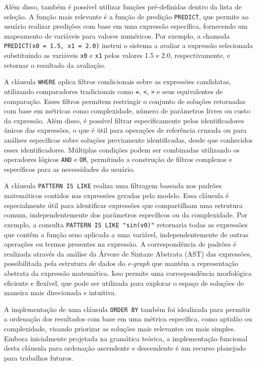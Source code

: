Além disso, também é possível utilizar funções pré-definidas dentro da lista de seleção. A função mais relevante é a função de predição \texttt{PREDICT}, que permite ao usuário realizar predições com base em uma expressão específica, fornecendo um mapeamento de variáveis para valores numéricos. Por exemplo, a chamada \texttt{PREDICT(x0 = 1.5, x1 = 2.0)} instrui o sistema a avaliar a expressão selecionada substituindo as variáveis \texttt{x0} e \texttt{x1} pelos valores 1.5 e 2.0, respectivamente, e retornar o resultado da avaliação.

A cláusula \texttt{WHERE} aplica filtros condicionais sobre as expressões candidatas, utilizando comparadores tradicionais como \texttt{=}, \texttt{<}, \texttt{>} e seus equivalentes de comparação. Esses filtros permitem restringir o conjunto de soluções retornadas com base em métricas como complexidade, número de parâmetros livres ou custo da expressão. Além disso, é possível filtrar especificamente pelos identificadores únicos das expressões, o que é útil para operações de referência cruzada ou para análises específicas sobre soluções previamente identificadas, desde que conhecidos esses identificadores. Múltiplas condições podem ser combinadas utilizando os operadores lógicos \texttt{AND} e \texttt{OR}, permitindo a construção de filtros complexos e específicos para as necessidades do usuário.

A cláusula \texttt{PATTERN IS LIKE} realiza uma filtragem baseada nos padrões matemáticos contidos nas expressões geradas pelo modelo. Essa cláusula é especialmente útil para identificar expressões que compartilham uma estrutura comum, independentemente dos parâmetros específicos ou da complexidade. Por exemplo, a consulta \texttt{PATTERN IS LIKE "sin(v0)"} retornaria todas as expressões que contêm a função seno aplicada a uma variável, independentemente de outras operações ou termos presentes na expressão. A correspondência de padrões é realizada através da análise da Árvore de Sintaxe Abstrata (AST) das expressões, possibilitada pela estrutura de dados do \textit{e-graph} que mantém a representação abstrata da expressão matemática. Isso permite uma correspondência morfológica eficiente e flexível, que pode ser utilizada para explorar o espaço de soluções de maneira mais direcionada e intuitiva.

A implementação de uma cláusula \texttt{ORDER BY} também foi idealizada para permitir a ordenação dos resultados com base em uma métrica específica, como aptidão ou complexidade, visando priorizar as soluções mais relevantes ou mais simples. Embora inicialmente projetada na gramática teórica, a implementação funcional desta cláusula para ordenação ascendente e descendente é um recurso planejado para trabalhos futuros.

